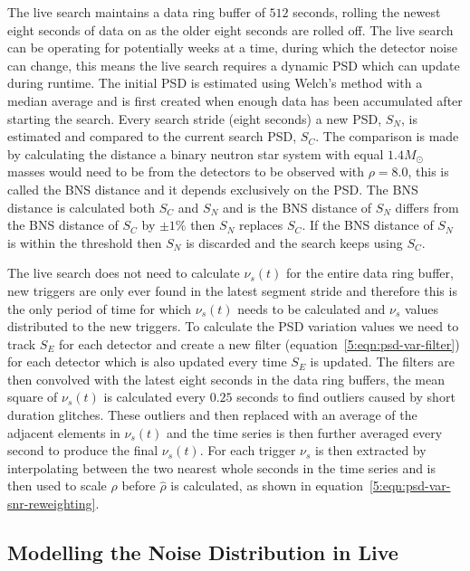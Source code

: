 
The live search maintains a data ring buffer of $512$ seconds, rolling the newest eight seconds of data on as the older eight seconds are rolled off. The live search can be operating for potentially weeks at a time, during which the detector noise can change, this means the live search requires a dynamic PSD which can update during runtime. The initial PSD is estimated using Welch's method with a median average and is first created when enough data has been accumulated after starting the search. Every search stride (eight seconds) a new PSD, $S_{N}$, is estimated and compared to the current search PSD, $S_{C}$. The comparison is made by calculating the distance a binary neutron star system with equal $1.4 M_{\odot}$ masses would need to be from the detectors to be observed with $\rho = 8.0$, this is called the BNS distance and it depends exclusively on the PSD. The BNS distance is calculated both $S_{C}$ and $S_{N}$ and is the BNS distance of $S_{N}$ differs from the BNS distance of $S_{C}$ by $\pm1\%$ then $S_{N}$ replaces $S_{C}$. If the BNS distance of $S_{N}$ is within the threshold then $S_{N}$ is discarded and the search keeps using $S_{C}$.

The live search does not need to calculate $\nu_{s}(t)$ for the entire data ring buffer, new triggers are only ever found in the latest segment stride and therefore this is the only period of time for which $\nu_{s}(t)$ needs to be calculated and $\nu_{s}$ values distributed to the new triggers. To calculate the PSD variation values we need to track $S_{E}$ for each detector and create a new filter (equation~\ref{5:eqn:psd-var-filter}) for each detector which is also updated every time $S_{E}$ is updated. The filters are then convolved with the latest eight seconds in the data ring buffers, the mean square of $\nu_{s}(t)$ is calculated every $0.25$ seconds to find outliers caused by short duration glitches. These outliers and then replaced with an average of the adjacent elements in $\nu_{s}(t)$ and the time series is then further averaged every second to produce the final $\nu_{s}(t)$. For each trigger $\nu_{s}$ is then extracted by interpolating between the two nearest whole seconds in the time series and is then used to scale $\rho$ before $\hat{\rho}$ is calculated, as shown in equation~\ref{5:eqn:psd-var-snr-reweighting}.

\subsection{\label{5:subsec:template-fits}Modelling the Noise Distribution in Live}

